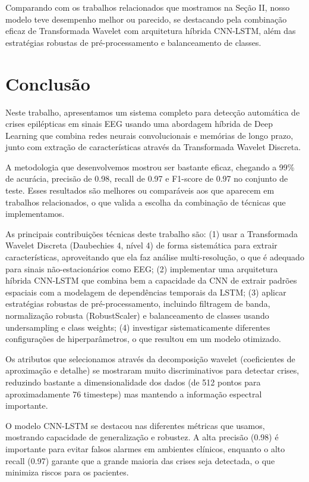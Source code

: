 \documentclass[12pt,a4paper]{article}
\begin{document}
Comparando com os trabalhos relacionados que mostramos na Seção II, nosso modelo teve desempenho melhor ou parecido, se destacando pela combinação eficaz de Transformada Wavelet com arquitetura híbrida CNN-LSTM, além das estratégias robustas de pré-processamento e balanceamento de classes.

\section{Conclusão}

Neste trabalho, apresentamos um sistema completo para detecção automática de crises epilépticas em sinais EEG usando uma abordagem híbrida de Deep Learning que combina redes neurais convolucionais e memórias de longo prazo, junto com extração de características através da Transformada Wavelet Discreta.

A metodologia que desenvolvemos mostrou ser bastante eficaz, chegando a 99\% de acurácia, precisão de 0.98, recall de 0.97 e F1-score de 0.97 no conjunto de teste. Esses resultados são melhores ou comparáveis aos que aparecem em trabalhos relacionados, o que valida a escolha da combinação de técnicas que implementamos.

As principais contribuições técnicas deste trabalho são: (1) usar a Transformada Wavelet Discreta (Daubechies 4, nível 4) de forma sistemática para extrair características, aproveitando que ela faz análise multi-resolução, o que é adequado para sinais não-estacionários como EEG; (2) implementar uma arquitetura híbrida CNN-LSTM que combina bem a capacidade da CNN de extrair padrões espaciais com a modelagem de dependências temporais da LSTM; (3) aplicar estratégias robustas de pré-processamento, incluindo filtragem de banda, normalização robusta (RobustScaler) e balanceamento de classes usando undersampling e class weights; (4) investigar sistematicamente diferentes configurações de hiperparâmetros, o que resultou em um modelo otimizado.

Os atributos que selecionamos através da decomposição wavelet (coeficientes de aproximação e detalhe) se mostraram muito discriminativos para detectar crises, reduzindo bastante a dimensionalidade dos dados (de 512 pontos para aproximadamente 76 timesteps) mas mantendo a informação espectral importante.

O modelo CNN-LSTM se destacou nas diferentes métricas que usamos, mostrando capacidade de generalização e robustez. A alta precisão (0.98) é importante para evitar falsos alarmes em ambientes clínicos, enquanto o alto recall (0.97) garante que a grande maioria das crises seja detectada, o que minimiza riscos para os pacientes.
\end{document}
